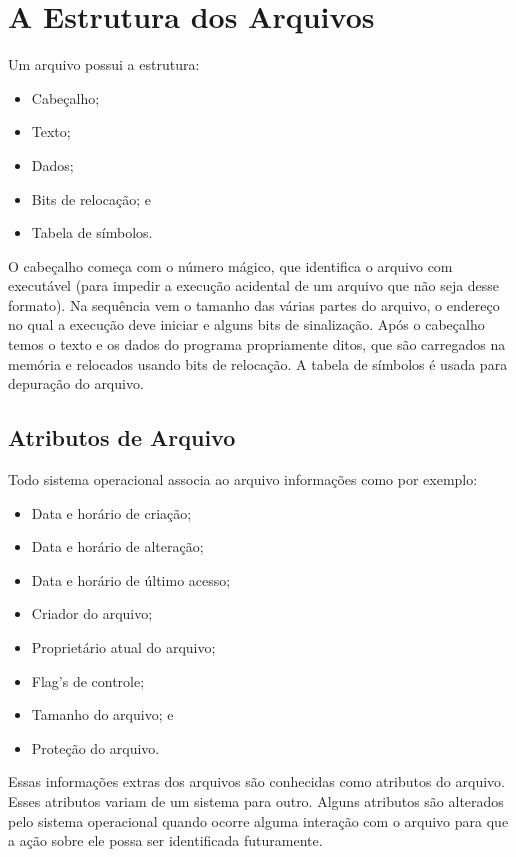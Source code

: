 \chapter{A Estrutura dos Arquivos}

Um arquivo possui a estrutura:

\begin{itemize}
	\item Cabeçalho;
	\item Texto;
	\item Dados;
	\item Bits de relocação; e
	\item Tabela de símbolos.
\end{itemize}

O cabeçalho começa com o número mágico, que identifica o arquivo com executável (para impedir a execução acidental de um arquivo que não seja desse formato). Na sequência vem o tamanho das várias partes do arquivo, o endereço no qual a execução deve iniciar e alguns bits de sinalização. Após o cabeçalho temos o texto e os dados do programa propriamente ditos, que são carregados na memória e relocados usando bits de relocação. A tabela de símbolos é usada para depuração do arquivo.

\section{Atributos de Arquivo}

Todo sistema operacional associa ao arquivo informações como por exemplo:

\begin{itemize}
	\item Data e horário de criação;	
	\item Data e horário de alteração;	
	\item Data e horário de último acesso;
	\item Criador do arquivo;
	\item Proprietário atual do arquivo;
	\item Flag's de controle;
	\item Tamanho do arquivo; e
	\item Proteção do arquivo.
\end{itemize}

Essas informações extras dos arquivos são conhecidas como atributos do arquivo. Esses atributos variam de um sistema para outro. Alguns atributos são alterados pelo sistema operacional quando ocorre alguma interação com o arquivo para que a ação sobre ele possa ser identificada futuramente.


